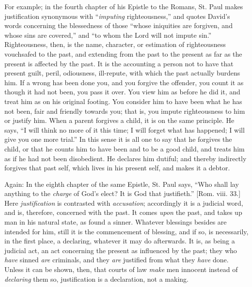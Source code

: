 For example; in the fourth chapter of his Epistle to the Romans,
St. Paul makes justification synonymous with ``\emph{imputing}
righteousness,'' and quotes David's words concerning the
blessedness of those ``whose iniquities are forgiven, and whose
sins are covered,'' and ``to whom the Lord will not impute
sin.'' Righteousness, then, is the name, character, or estimation
of righteousness vouchsafed to the past, and extending from the past
to the present as far as the present is affected by the past. It is
the accounting a person not to have that present guilt, peril,
odiousness, ill-repute, with which the past actually burdens him. If a
wrong has been done you, and you forgive the offender, you count it as
though it had not been, you pass it over. You view him as before he
did it, and treat him as on his original footing. You consider him to
have been what he has not been, fair and friendly towards you; that
is, you impute righteousness to him or justify him. When a parent
forgives a child, it is on the same principle. He says, ``I will
think no more of it this time; I will forget what has happened; I will
give you one more trial.'' In this sense it is all one to say that
he forgives the child, or that he counts him to have been and to be a
good child, and treats him as if he had not been disobedient. He
declares him dutiful; and thereby indirectly forgives that past self,
which lives in his present self, and makes it a debtor.

Again: In the eighth chapter of the same Epistle, St. Paul says,
``Who shall lay anything to the \emph{charge} of God's elect? It
is God that justifieth.'' [Rom. viii. 33.] Here \emph{justification}
is contrasted with \emph{accusation}; accordingly it is a judicial
word, and is, therefore, concerned with the past. It comes \emph{upon}
the past, and takes up man in his natural state, as found a
sinner. Whatever blessings besides are intended for him, still it is
the commencement of blessing, and if so, is necessarily, in the first
place, a declaring, whatever it may do afterwards. It is, as being a
judicial act, an act concerning the present as influenced by the past;
they who \emph{have} sinned \emph{are} criminals, and they \emph{are}
justified from what they \emph{have} done. Unless it can be shown,
then, that courts of law \emph{make} men innocent instead of \emph{declaring}
them so, justification is a declaration, not a making.

